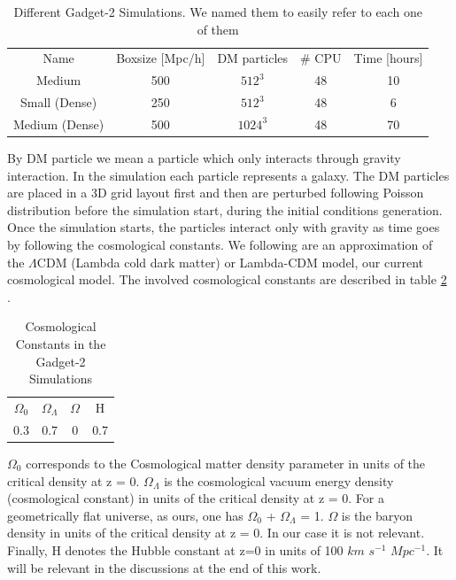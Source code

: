 \documentclass[12pt]{article}
\begin{document}
\begin{table}[ht]
    \centering
    \begin{tabular}{|c|c|c|c|c|}
        Name & Boxsize [Mpc/h] & DM particles & \# CPU & Time [hours] \\
        Medium & 500 & $512^{3}$ & 48 & ~ 10 \\
        Small (Dense) & 250 & $512^{3}$ & 48 & ~ 6  \\
        Medium (Dense) & 500 & $1024^{3}$ & 48 & ~ 70  \\
    \end{tabular}
    \caption{Different Gadget-2 Simulations. We named them to easily refer to each one of them}
    \label{tab:sims}
\end{table}
\FloatBarrier

By DM particle we mean a particle which only
 interacts through gravity
interaction. In the simulation each particle
 represents a galaxy. The DM particles are
placed in a 3D grid layout first and then are
 perturbed following Poisson distribution
before the simulation start, during the initial
 conditions generation.\\

Once the simulation starts, the particles interact
 only with gravity as time goes by following the
  cosmological constants. We following are an
   approximation of the $\Lambda$CDM (Lambda cold
    dark matter) or Lambda-CDM model, our current
     cosmological model. The involved
     cosmological constants are described in table
      \ref{tab:consts}\\.
   
  
 \begin{table}[ht]
    \centering
    \begin{tabular}{|c|c|c|c|}
        $\Omega_0$ & $\Omega_{\Lambda}$ & $\Omega$ & H \\
        0.3 &  0.7 & 0 & 0.7 \\
    \end{tabular}
    \caption{Cosmological Constants in the Gadget-2 Simulations}
    \label{tab:consts}
\end{table}
\FloatBarrier
$\Omega_0$  corresponds to the Cosmological matter density parameter in units of the critical density at
z = 0. $\Omega_{\Lambda}$ is the cosmological
 vacuum energy density (cosmological constant) in
  units of the critical density at z = 0. 
For a geometrically flat universe, as ours, one has $\Omega_0$ + $\Omega_{\Lambda}$ = 1.
 $\Omega$ is the baryon density in units
  of the critical density at z = 0. In our case it
   is not relevant. Finally, H denotes the Hubble
    constant at z=0 in  units of 100 $km$ $s^{-1}$
     $Mpc^{-1}$. It will be relevant in the
      discussions at the end of this work.
\end{document}
